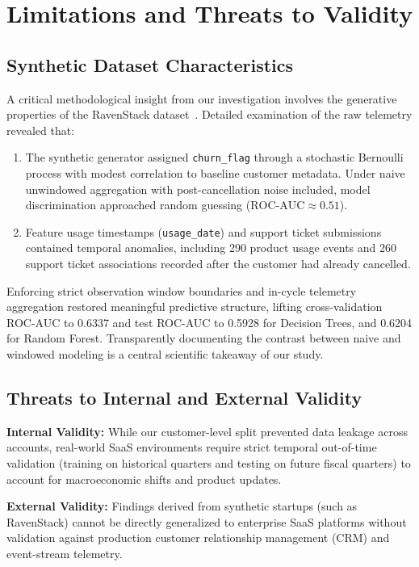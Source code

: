 \documentclass[pdflatex,sn-mathphys-num]{sn-jnl}
\begin{document}
\section{Limitations and Threats to Validity}\label{sec:limitations}

\subsection{Synthetic Dataset Characteristics}
A critical methodological insight from our investigation involves the generative properties of the RavenStack dataset~\cite{rivalytics2025ravenstack}. Detailed examination of the raw telemetry revealed that:
\begin{enumerate}
    \item The synthetic generator assigned \texttt{churn\_flag} through a stochastic Bernoulli process with modest correlation to baseline customer metadata. Under naive unwindowed aggregation with post-cancellation noise included, model discrimination approached random guessing ($\text{ROC-AUC} \approx 0.51$).
    \item Feature usage timestamps (\texttt{usage\_date}) and support ticket submissions contained temporal anomalies, including 290 product usage events and 260 support ticket associations recorded after the customer had already cancelled.
\end{enumerate}
Enforcing strict observation window boundaries and in-cycle telemetry aggregation restored meaningful predictive structure, lifting cross-validation ROC-AUC to 0.6337 and test ROC-AUC to 0.5928 for Decision Trees, and 0.6204 for Random Forest. Transparently documenting the contrast between naive and windowed modeling is a central scientific takeaway of our study.

\subsection{Threats to Internal and External Validity}
\textbf{Internal Validity:} While our customer-level split prevented data leakage across accounts, real-world SaaS environments require strict temporal out-of-time validation (training on historical quarters and testing on future fiscal quarters) to account for macroeconomic shifts and product updates.

\textbf{External Validity:} Findings derived from synthetic startups (such as RavenStack) cannot be directly generalized to enterprise SaaS platforms without validation against production customer relationship management (CRM) and event-stream telemetry.
\end{document}
